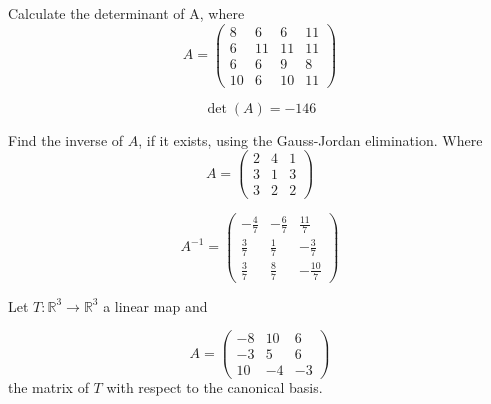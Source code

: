 \begin{questions}

\question Calculate the determinant of A, where
$$
A=\left(\begin{array}{rrrr}
8 & 6 & 6 & 11 \\
6 & 11 & 11 & 11 \\
6 & 6 & 9 & 8 \\
10 & 6 & 10 & 11
\end{array}\right)
$$

\begin{solution}
$$\det(A)=-146$$
\end{solution}

\question Find the inverse of $A$, if it exists, using the Gauss-Jordan elimination. Where
$$
A=\left(\begin{array}{rrr}
2 & 4 & 1 \\
3 & 1 & 3 \\
3 & 2 & 2
\end{array}\right)
$$

\begin{solution}
$$A^{-1}=\left(\begin{array}{rrr}
-\frac{4}{7} & -\frac{6}{7} & \frac{11}{7} \\
\frac{3}{7} & \frac{1}{7} & -\frac{3}{7} \\
\frac{3}{7} & \frac{8}{7} & -\frac{10}{7}
\end{array}\right)$$
\end{solution}

\question Let $T:\mathbb{R}^3\rightarrow\mathbb{R}^3$  a linear map and
 
$$
A=\left(\begin{array}{rrr}
-8 & 10 & 6 \\
-3 & 5 & 6 \\
10 & -4 & -3
\end{array}\right)
$$
the matrix of $T$ with respect to the canonical basis.
\end{questions}
